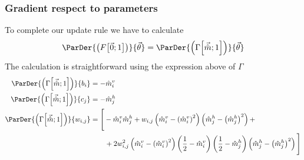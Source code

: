 \subsubsection{Gradient respect to parameters}
To complete our update rule we have to calculate
\[
  \ParDer{\left(\FEn{\vec{0}}{1}\right)}{\vec{\theta}} =
  \ParDer{\left(\Gam{\vec{\hat{m}}}{1}\right)}{\vec{\theta}}
\]  
The calculation is straightforward using the expression above of \(\Gamma\)
\begin{align*}
  \ParDer{\left(\Gam{\vec{\hat{m}}}{1}\right)}{b_i} &= -\hmvi\\
  \ParDer{\left(\Gam{\vec{\hat{m}}}{1}\right)}{c_j} &= -\hmhj\\
  \ParDer{\left(\Gam{\vec{\hat{m}}}{1}\right)}{w_{i,j}}
    &=\Bigg[-\hmvi\hmhj +w_{i,j}\left(\hmvi-\hmvisq\right)\left(\hmhj-\hmhjsq\right)+\\
    &\qquad+2w_{i,j}^2\left(\hmvi-\hmvisq\right)\left(\frac{1}{2}-\hmvi\right)\left(\frac{1}{2}-\hmhj\right)
      \left(\hmhj-\hmhjsq\right)\Bigg]
\end{align*}